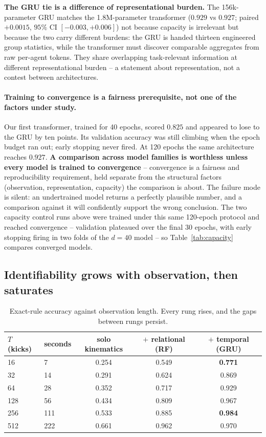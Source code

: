 \documentclass[11pt]{article}
\begin{document}
\textbf{The GRU tie is a difference of representational burden.} The 156k-parameter
GRU matches the 1.8M-parameter transformer ($0.929$ vs $0.927$; paired $+0.0015$,
$95\%$ CI $[-0.003,+0.006]$) not because capacity is irrelevant but because the two
carry different burdens: the GRU is handed thirteen engineered group statistics, while
the transformer must discover comparable aggregates from raw per-agent tokens. They
share overlapping task-relevant information at different representational burden -- a
statement about representation, not a contest between architectures.

\paragraph{Training to convergence is a fairness prerequisite, not one of the factors
under study.} Our first transformer, trained for 40 epochs, scored $0.825$ and
appeared to lose to the GRU by ten points. Its validation accuracy was still climbing
when the epoch budget ran out; early stopping never fired. At 120 epochs the same
architecture reaches $0.927$. \textbf{A comparison across model families is worthless
unless every model is trained to convergence} -- convergence is a fairness and
reproducibility requirement, held separate from the structural factors (observation,
representation, capacity) the comparison is about. The failure mode is silent: an
undertrained model returns a perfectly plausible number, and a comparison against it
will confidently support the wrong conclusion. The two capacity control runs above were
trained under this same 120-epoch protocol and reached convergence -- validation
plateaued over the final 30 epochs, with early stopping firing in two folds of the
$d{=}40$ model -- so Table~\ref{tab:capacity} compares converged models.

\subsection{Identifiability grows with observation, then saturates}

\begin{table}[t]
\centering
\small
\caption{Exact-rule accuracy against observation length. Every rung rises, and the
gaps between rungs persist.}
\label{tab:window}
\begin{tabular}{llccc}
\toprule
$T$ (kicks) & seconds & solo kinematics & $+$ relational (RF) & $+$ temporal (GRU) \\
\midrule
16  & 7   & 0.254 & 0.549 & \textbf{0.771} \\
32  & 14  & 0.291 & 0.624 & 0.869 \\
64  & 28  & 0.352 & 0.717 & 0.929 \\
128 & 56  & 0.434 & 0.809 & 0.967 \\
256 & 111 & 0.533 & 0.885 & \textbf{0.984} \\
512 & 222 & 0.661 & 0.962 & 0.970 \\
\bottomrule
\end{tabular}
\end{table}
\end{document}
